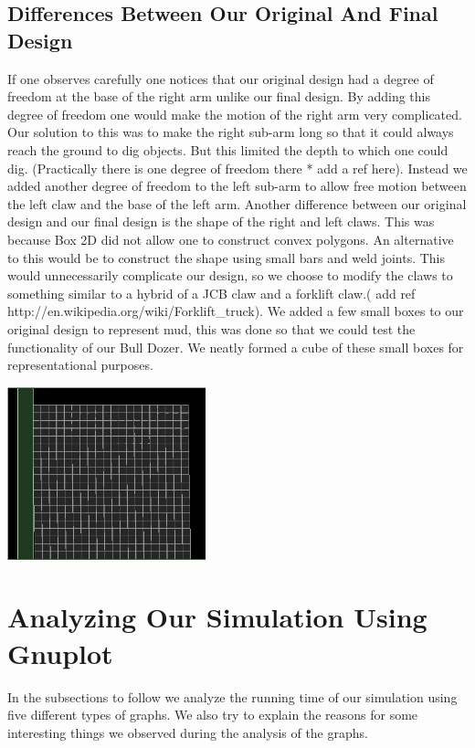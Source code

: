 \documentclass[11pt]{article}
\begin{document}
	\subsection{Differences Between Our Original And Final Design}
	If one observes carefully one notices that our original design had a degree of freedom at the base of the right arm unlike our final design. By adding this degree of freedom one would make the motion of the right arm very complicated. Our solution to this was to make the right sub-arm long so that it could always reach the ground to dig objects. But this limited the depth to which one could dig.
(Practically there is one degree of freedom there * add a ref here). Instead we added another degree of freedom to the left sub-arm to allow free motion between the left claw and the base of the left arm.\newline
	Another difference between our original design and our final design is the shape of the right and left claws. This was because Box 2D did not allow one to construct convex polygons. An alternative to this would be to construct the shape using small bars and weld joints. This would unnecessarily complicate our design, so we choose to modify the claws to something similar to a hybrid of a JCB claw and a forklift claw.( add ref http://en.wikipedia.org/wiki/Forklift\_truck).\newline
	 We added a few small boxes to our original design to represent mud, this was done so that we could test the functionality of our Bull Dozer. We neatly formed a cube of these small boxes for representational purposes.
	\begin{center}\includegraphics[height=5cm]{Boxes.png}\end{center}
\section{Analyzing Our Simulation Using Gnuplot}
	In the subsections to follow we analyze the running time of our simulation using five different types of graphs. We also try to explain the reasons for some interesting things we observed during the analysis of the graphs. 
\end{document}
